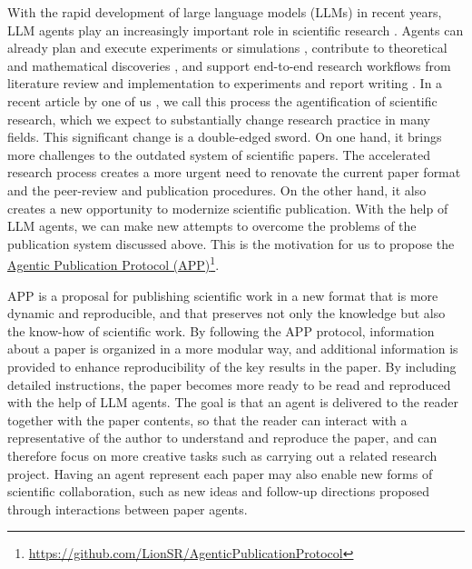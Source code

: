 \documentclass{article}
\begin{document}
With the rapid development of large language models (LLMs) in recent years, LLM agents play an increasingly important role in scientific research \cite{Wang2023Scientific,qi2026agentification,bubeck2025early,lu2025theoreticalphysics}. Agents can already plan and execute experiments or simulations \cite{boiko2023coscientist,bran2024chemistrytools,liu2025vaspilot}, contribute to theoretical and mathematical discoveries \cite{gottweis2025aicoscientist,li2024modeldiscovery,brenner2026openproblem,guevara2026graviton,feng2026towards,zheng2026aicomathematician,tsoukalas2026advancing,openai2026unitdistance,alon2026remarks}, and support end-to-end research workflows from literature review and implementation to experiments and report writing \cite{lu2024aiscientist,yamada2025aiscientistv2,schmidgall2025agentlab,zhou2026paperprogram,deng2026physvec}. In a recent article by one of us \cite{qi2026agentification}, we call this process the agentification of scientific research, which we expect to substantially change research practice in many fields. This significant change is a double-edged sword. On one hand, it brings more challenges to the outdated system of scientific papers. The accelerated research process creates a more urgent need to renovate the current paper format and the peer-review and publication procedures. On the other hand, it also creates a new opportunity to modernize scientific publication. With the help of LLM agents, we can make new attempts to overcome the problems of the publication system discussed above. This is the motivation for us to propose the \href{https://github.com/LionSR/AgenticPublicationProtocol}{Agentic Publication Protocol (APP)}\footnote{\url{https://github.com/LionSR/AgenticPublicationProtocol}}.

APP is a proposal for publishing scientific work in a new format that is more dynamic and reproducible, and that preserves not only the knowledge but also the know-how of scientific work. By following the APP protocol, information about a paper is organized in a more modular way, and additional information is provided to enhance reproducibility of the key results in the paper. By including detailed instructions, the paper becomes more ready to be read and reproduced with the help of LLM agents. The goal is that an agent is delivered to the reader together with the paper contents, so that the reader can interact with a representative of the author to understand and reproduce the paper, and can therefore focus on more creative tasks such as carrying out a related research project. Having an agent represent each paper may also enable new forms of scientific collaboration, such as new ideas and follow-up directions proposed through interactions between paper agents.
\end{document}
